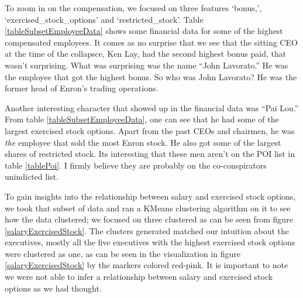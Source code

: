 \documentclass[twoside,openright,titlepage,numbers=noenddot,headinclude,%
               footinclude=true,cleardoublepage=empty,abstractoff,BCOR=5mm,%
               paper=a4,fontsize=11pt,ngerman,american]{scrreprt}
\numberwithin{theorem}{chapter}
\numberwithin{definition}{chapter}
\numberwithin{algorithm}{chapter}
\numberwithin{figure}{chapter}
\numberwithin{table}{chapter}
\numberwithin{equation}{chapter}
\begin{document}
To zoom in on the compensation, we focused on three features `bonus,', `exercised\_stock\_options' and `restricted\_stock'. Table \ref{tableSubsetEmployeeData} shows some financial data for some of the highest compensated employees. It comes as no surprise that we see that the sitting CEO at the time of the collapsce, Ken Lay, had the second highest bonus paid, that wasn't surprising. What was surprising was the name ``John Lavorato.'' He was the employee that got the highest bonus. So who was John Lavorato? He was the former head of Enron's trading operations. 

Another interesting character that showed up in the financial data was ``Pai Lou.'' From table \ref{tableSubsetEmployeeData}, one can see that he had some of the largest exercised stock options. Apart from the past CEOs and chairmen, he was \textit{the} employee that sold the most Enron stock. He also got some of the largest shares of restricted stock. Its interesting that these men aren't on the POI list in table \ref{tablePoi}. I firmly believe they are probably on the co-conspirators unindicted list.

To gain insights into the relationship between salary and exercised stock options, we took that subset of data and ran a KMeans clustering algorithm on it to see how the data clustered; we focused on three clustered as can be seen from figure \ref{salaryExercisedStock}. The clusters generated matched our intuition about the executives, mostly all the five executives with the highest exercised stock options were clustered as one, as can be seen in the visualization in figure \ref{salaryExercisedStock} by the markers colored red-pink. It is important to note we were not able to infer a relationship between salary and exercised stock options as we had thought. 
\end{document}
